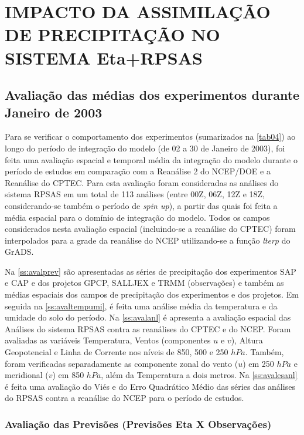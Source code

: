 \hypertarget{estilo:capitulo}{}
\chapter{IMPACTO DA ASSIMILAÇÃO DE PRECIPITAÇÃO NO SISTEMA Eta+RPSAS}
\label{ss:cap3}

\section{Avaliação das médias dos experimentos durante Janeiro de 2003}
\label{ss:avalmedia}

Para se verificar o comportamento dos experimentos (sumarizados na \autoref{tab04}) ao longo do período de integração do modelo (de 02 a 30 de Janeiro de 2003), foi feita uma avaliação espacial e temporal média da integração do modelo durante o período de estudos em comparação com a Reanálise 2 do NCEP/DOE e a Reanálise do CPTEC. Para esta avaliação foram consideradas as análises do sistema RPSAS em um total de 113 análises (entre 00Z, 06Z, 12Z e 18Z, considerando-se também  o período de \textit{spin up}), a partir das quais foi feita a média espacial para o domínio de integração do modelo. Todos os campos considerados nesta avaliação espacial (incluindo-se a reanálise do CPTEC) foram interpolados para a grade da reanálise do NCEP utilizando-se a função \textit{lterp} do GrADS. 

Na \autoref{ss:avalprev} são apresentadas as séries de precipitação dos experimentos SAP e CAP e dos projetos GPCP, SALLJEX e TRMM (observações) e também as médias espaciais dos campos de precipitação dos experimentos e dos projetos. Em seguida na \autoref{ss:avaltempumi}, é feita uma análise média da temperatura e da umidade do solo do período. Na \autoref{ss:avalanl} é apresenta a avaliação espacial das Análises do sistema RPSAS contra as reanálises do CPTEC e do NCEP. Foram avaliadas as variáveis Temperatura, Ventos (componentes $u$ e $v$), Altura Geopotencial e Linha de Corrente nos níveis de 850, 500 e 250 $hPa$. Também, foram verificadas separadamente as componente zonal do vento ($u$) em 250 $hPa$ e meridional ($v$) em 850 $hPa$, além da Temperatura a dois metros. Na \autoref{ss:avalesanl} é feita uma avaliação do Viés e do Erro Quadrático Médio das séries das análises do RPSAS contra a reanálise do NCEP para o período de estudos.

\subsection{Avaliação das Previsões (Previsões Eta X Observações)}
\label{ss:avalprev}

